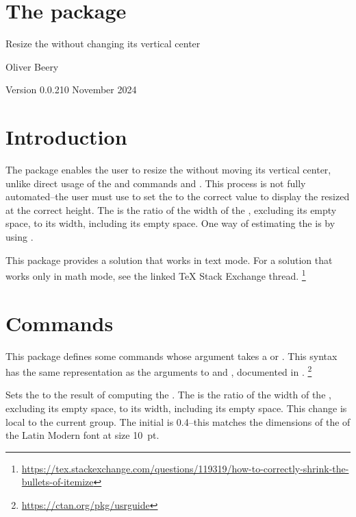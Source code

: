 \documentclass{beery}
\begin{document}
\section*
  {%
    The  package%
  }

Resize the  without changing its vertical center

Oliver Beery

Version 0.0.2\quad{}10 November 2024


\section{Introduction}
\label{sec:intro}

The  package enables the user to resize the  without moving its vertical center, unlike direct usage of the \LaTeXe{} and  commands  and .
This process is not fully automated\---the user must use  to set the \textbulletfactor{} to the correct value to display the resized  at the correct height.
The \textbulletfactor{} is the ratio of the width of the , excluding its empty space, to its width, including its empty space.
One way of estimating the \textbulletfactor{} is by using .

This package provides a solution that works in text mode.
For a solution that works only in math mode, see the linked \TeX{} Stack Exchange thread.%
\footnote{\url{https://tex.stackexchange.com/questions/119319/how-to-correctly-shrink-the-bullets-of-itemize}}


\section{Commands}
\label{sec:commands}

This package defines some commands whose argument takes a  or .
This syntax has the same representation as the arguments to  and , documented in .%
\footnote{\url{https://ctan.org/pkg/usrguide}}

 
\KeepNextPar*

Sets the \textbulletfactor{} to the result of computing the .
The \textbulletfactor{} is the ratio of the width of the , excluding its empty space, to its width, including its empty space.
This change is local to the current group.
The initial \textbulletfactor{} is \num{0.4}\---this matches the dimensions of the  of the Latin Modern font at size \qty{10}{pt}.
\end{document}
